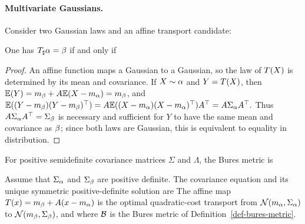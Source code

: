 \paragraph{Multivariate Gaussians.} Consider two Gaussian laws and an affine transport candidate:
\begin{prop}\label{prop-gaussian-affine-push-forward}
One has $T_\sharp\alpha=\beta$ if and only if
\end{prop}
\begin{proof}
An affine function maps a Gaussian to a Gaussian, so the law of $T(X)$ is determined by its mean and covariance. If $X\sim\alpha$ and $Y=T(X)$, then
\(\mathbb{E}(Y)=m_\beta+A\mathbb{E}(X-m_\alpha)=m_\beta\),
and
\(\mathbb{E}((Y-m_\beta)(Y-m_\beta)^\top) = A\mathbb{E}((X-m_\alpha)(X-m_\alpha)^\top)A^\top = A\Sigma_\alpha A^\top.\)
Thus $A\Sigma_\alpha A^\top=\Sigma_\beta$ is necessary and sufficient for $Y$ to have the same mean and covariance as $\beta$; since both laws are Gaussian, this is equivalent to equality in distribution.
\end{proof}
\begin{defn}\label{def-bures-metric}
For positive semidefinite covariance matrices $\Sigma$ and $\Lambda$, the Bures metric is
\end{defn}
\begin{prop}\label{prop-gaussian-w2-bures}
Assume that $\Sigma_\alpha$ and $\Sigma_\beta$ are positive definite. The covariance equation and its unique symmetric positive-definite solution are
The affine map $T(x)=m_\beta+A(x-m_\alpha)$ is the optimal quadratic-cost transport from $\mathcal{N}(m_\alpha,\Sigma_\alpha)$ to $\mathcal{N}(m_\beta,\Sigma_\beta)$, and
where $\mathcal{B}$ is the Bures metric of Definition~\ref{def-bures-metric}.
\end{prop}
